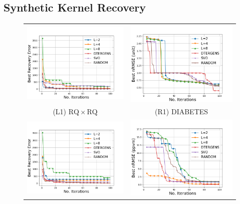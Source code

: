 \subsection{Synthetic Kernel Recovery}
\begin{figure}
\centering
\begin{tabular}{cc}
\vspace{-2mm}
\includegraphics[width=0.45\linewidth]{./kernel_plots/synthetic_exp0.png} & \includegraphics[width=0.45\linewidth]{./kernel_plots/diabetes.png} \\ 
\vspace{-1mm}
(L1) $\mathrm{RQ} \times \mathrm{RQ}$ & (R1) DIABETES \\
\includegraphics[width=0.45\linewidth]{./kernel_plots/synthetic_exp1.png} & 
\includegraphics[width=0.45\linewidth]{./kernel_plots/mauna.png} \\ 

\end{tabular}
\end{figure}
